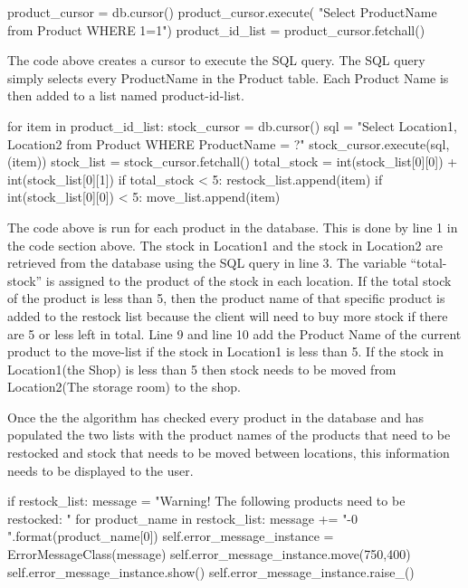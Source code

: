 \begin{python}
product_cursor = db.cursor()
product_cursor.execute( "Select ProductName from Product WHERE 1=1")
product_id_list = product_cursor.fetchall()
\end{python}

The code above creates a cursor to execute the SQL query. The SQL query simply selects every ProductName in the Product table. Each Product Name is then added to a list named product-id-list. 

\begin{python}
for item in product_id_list:
            stock_cursor = db.cursor()
            sql = "Select Location1, Location2 from Product WHERE ProductName = ?"
            stock_cursor.execute(sql, (item))
            stock_list = stock_cursor.fetchall()
            total_stock = int(stock_list[0][0]) + int(stock_list[0][1])
            if total_stock < 5:
                restock_list.append(item)
            if int(stock_list[0][0]) < 5:
                move_list.append(item)
\end{python}

The code above is run for each product in the database. This is done by line 1 in the code section above. The stock in Location1 and the stock in Location2 are retrieved from the database using the SQL query in line 3. The variable ``total-stock'' is assigned to the product of the stock in each location. If the total stock of the product is less than 5, then the product name of that specific product is added to the restock list because the client will need to buy more stock if there are 5 or less left in total. Line 9 and line 10 add the Product Name of the current product to the move-list if the stock in Location1 is less than 5. If the stock in Location1(the Shop) is less than 5 then stock needs to be moved from Location2(The storage room) to the shop.

Once the the algorithm has checked every product in the database and has populated the two lists with the product names of the products that need to be restocked and stock that needs to be moved between locations, this information needs to be displayed to the user.

\begin{python}
if restock_list:
            message = "Warning! \n \n The following products need to be restocked: \n \n "
            for product_name in restock_list:
                message += "-{0} \n".format(product_name[0])
            self.error_message_instance = ErrorMessageClass(message)
            self.error_message_instance.move(750,400)
            self.error_message_instance.show()
            self.error_message_instance.raise_()
\end{python}

